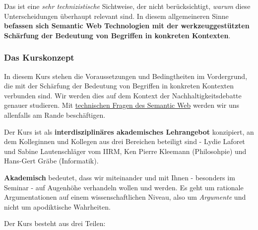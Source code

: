 \documentclass[11pt,a4paper]{article}
\begin{document}
Das ist eine \emph{sehr technizistische} Sichtweise, der nicht
berücksichtigt, \emph{warum} diese Unterscheidungen überhaupt relevant
sind. In diesem allgemeineren Sinne \textbf{befassen sich Semantic Web
Technologien mit der werkzeuggestützten Schärfung der Bedeutung von
Begriffen in konkreten Kontexten}.

\hypertarget{das-kurskonzept}{%
\subsubsection{Das Kurskonzept}\label{das-kurskonzept}}

In diesem Kurs stehen die Voraussetzungen und Bedingtheiten im
Vordergrund, die mit der Schärfung der Bedeutung von Begriffen in
konkreten Kontexten verbunden sind. Wir werden dies auf dem Kontext der
Nachhaltigkeitsdebatte genauer studieren. Mit
\href{https://www.semantic-web-grundlagen.de/}{technischen Fragen des
Semantic Web} werden wir uns allenfalls am Rande beschäftigen.

Der Kurs ist als \textbf{interdisziplinäres akademisches Lehrangebot}
konzipiert, an dem Kolleginnen und Kollegen aus drei Bereichen beteiligt
sind - Lydie Laforet und Sabine Lautenschläger vom IIRM, Ken Pierre
Kleemann (Philosohpie) und Hans-Gert Gräbe (Informatik).

\textbf{Akademisch} bedeutet, dass wir miteinander und mit Ihnen -
besonders im Seminar - auf Augenhöhe verhandeln wollen und werden. Es
geht um rationale Argumentationen auf einem wissenschaftlichen Niveau,
also um \emph{Argumente} und nicht um apodiktische Wahrheiten.

Der Kurs besteht aus drei Teilen:
\end{document}
